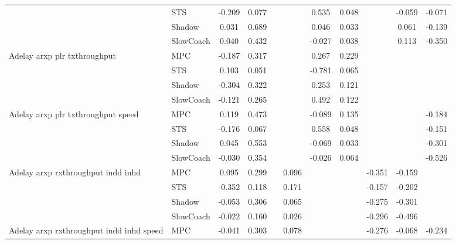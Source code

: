 \begin{tabular}{|l|l|*{9}{c|}}
                              & STS &   -0.209 &     0.077 &        &     &  0.535 &  0.048 &      &  -0.059 &   -0.071 \\
                              & Shadow &    0.031 &     0.689 &        &     &  0.046 &  0.033 &      &   0.061 &   -0.139 \\
                              & SlowCoach &    0.040 &     0.432 &        &     & -0.027 &  0.038 &      &   0.113 &   -0.350 \\
\midrule
Adelay arxp plr txthroughput    & MPC &   -0.187 &     0.317 &        &     &  0.267 &  0.229 &      &      &       \\
                              & STS &    0.103 &     0.051 &        &     & -0.781 &  0.065 &      &      &       \\
                              & Shadow &   -0.304 &     0.322 &        &     &  0.253 &  0.121 &      &      &       \\
                              & SlowCoach &   -0.121 &     0.265 &        &     &  0.492 &  0.122 &      &      &       \\
\midrule
Adelay arxp plr txthroughput speed    & MPC &    0.119 &     0.473 &        &     & -0.089 &  0.135 &      &      &   -0.184 \\
                              & STS &   -0.176 &     0.067 &        &     &  0.558 &  0.048 &      &      &   -0.151 \\
                              & Shadow &    0.045 &     0.553 &        &     & -0.069 &  0.033 &      &      &   -0.301 \\
                              & SlowCoach &   -0.030 &     0.354 &        &     & -0.026 &  0.064 &      &      &   -0.526 \\
\midrule
Adelay arxp rxthroughput indd inhd    & MPC &    0.095 &     0.299 &        &  0.096 &     &     &  -0.351 &  -0.159 &       \\
                              & STS &   -0.352 &     0.118 &        &  0.171 &     &     &  -0.157 &  -0.202 &       \\
                              & Shadow &   -0.053 &     0.306 &        &  0.065 &     &     &  -0.275 &  -0.301 &       \\
                              & SlowCoach &   -0.022 &     0.160 &        &  0.026 &     &     &  -0.296 &  -0.496 &       \\
\midrule
Adelay arxp rxthroughput indd inhd speed    & MPC &   -0.041 &     0.303 &        &  0.078 &     &     &  -0.276 &  -0.068 &   -0.234 \\

\end{tabular}
